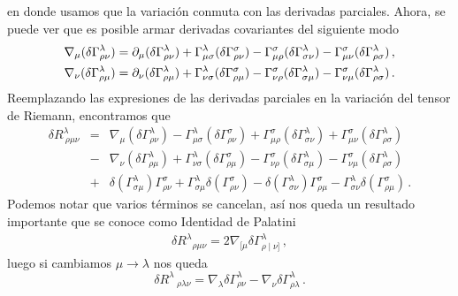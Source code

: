 \documentclass[../Main.tex]{subfiles}
\begin{document}
en donde usamos que la variación conmuta con las derivadas parciales. Ahora, se puede ver que es posible armar derivadas covariantes del siguiente modo
\begin{align}\notag
    \nabla_{\mu}(\delta\Gamma^{\lambda}_{\rho\nu})&= \partial_{\mu}(\delta\Gamma^{\lambda}_{\rho\nu})+\Gamma^{\lambda}_{\mu\sigma}(\delta\Gamma^{\sigma}_{\rho\nu})-\Gamma^{\sigma}_{\mu\rho}(\delta\Gamma^{\lambda}_{\sigma\nu})-\Gamma^{\sigma}_{\mu\nu}(\delta\Gamma^{\lambda}_{\rho\sigma})\, ,\\
    \nabla_{\nu}(\delta\Gamma^{\lambda}_{\rho\mu})&= \partial_{\nu}(\delta\Gamma^{\lambda}_{\rho\mu})+\Gamma^{\lambda}_{\nu\sigma}(\delta\Gamma^{\sigma}_{\rho\mu})-\Gamma^{\sigma}_{\nu\rho}(\delta\Gamma^{\lambda}_{\sigma\mu})-\Gamma^{\sigma}_{\nu\mu}(\delta\Gamma^{\lambda}_{\rho\sigma})\, .
\end{align}
Reemplazando las expresiones de las derivadas parciales en la variación del tensor de Riemann, encontramos que 
\begin{eqnarray*}
    \delta R^{\lambda}_{\ \rho\mu\nu}&=&\nabla_{\mu}(\delta\Gamma^{\lambda}_{\rho\nu})-\Gamma^{\lambda}_{\mu\sigma}(\delta\Gamma^{\sigma}_{\rho\nu})+\Gamma^{\sigma}_{\mu\rho}(\delta\Gamma^{\lambda}_{\sigma\nu})+\Gamma^{\sigma}_{\mu\nu}(\delta\Gamma^{\lambda}_{\rho\sigma})\\
    &-&\nabla_{\nu}(\delta\Gamma^{\lambda}_{\rho\mu})+\Gamma^{\lambda}_{\nu\sigma}(\delta\Gamma^{\sigma}_{\rho\mu})-\Gamma^{\sigma}_{\nu\rho}(\delta\Gamma^{\lambda}_{\sigma\mu})-\Gamma^{\sigma}_{\nu\mu}(\delta\Gamma^{\lambda}_{\rho\sigma})\\
     &+&\delta(\Gamma^{\lambda}_{\sigma\mu})\Gamma^{\sigma}_{\rho\nu}+\Gamma^{\lambda}_{\sigma\mu}\delta(\Gamma^{\sigma}_{\rho\nu})-\delta(\Gamma^{\lambda}_{\sigma\nu})\Gamma^{\sigma}_{\rho\mu}-\Gamma^{\lambda}_{\sigma\nu}\delta(\Gamma^{\sigma}_{\rho\mu})\,.
\end{eqnarray*}
Podemos notar que varios términos se cancelan, así nos queda un resultado importante que se conoce como Identidad de Palatini 
\begin{align}
    \delta R^{\lambda}{}_{\rho\mu\nu}=2 \nabla_{[\mu } \delta \Gamma_{\rho \mid \nu]}^\lambda \label{palatini}\, ,
\end{align}
luego si cambiamos $\mu\to\lambda$ nos queda 
\begin{equation}
    \delta R^{\lambda}\,_{\rho\lambda\nu}=\nabla_{\lambda}\delta\Gamma^{\lambda}_{\rho\nu}-\nabla_{\nu}\delta\Gamma^{\lambda}_{\rho\lambda}\, . \label{pal}
\end{equation}
\end{document}
